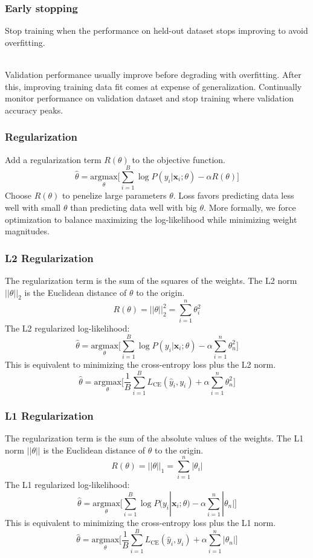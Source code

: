 \documentclass[11pt]{article}
\begin{document}
\subsubsection{Early stopping}
\begin{definition}
Stop training when the performance on held-out dataset stops improving to avoid overfitting.
\end{definition}
$\quad$\\[-1em]
Validation performance usually improve before degrading with overfitting. After this, improving training data fit comes at expense of generalization. Continually monitor performance on validation dataset and stop training where validation accuracy peaks.

\subsubsection{Regularization}
Add a regularization term $R(\theta)$ to the objective function.
$$
\hat{\theta}=\underset{\theta}{\text{argmax}}\Big[\sum_{i=1}^{B}\log P(y_i|\mathbf{x}_i;\theta)-\alpha R(\theta)\Big]
$$
Choose $R(\theta)$ to penelize large parameters $\theta$. Loss favors predicting data less well with small $\theta$ than predicting data well with big $\theta$. More formally, we force optimization to balance maximizing the log-likelihood while minimizing weight magnitudes.

\subsubsection{L2 Regularization}
The regularization term is the sum of the squares of the weights. The L2 norm $||\theta||_2$ is the Euclidean distance of $\theta$ to the origin.
$$
R(\theta)=||\theta||_2^2=\sum_{i=1}^{n}\theta_{i}^2
$$
The L2 regularized log-likelihood:
$$
\hat{\theta}=\underset{\theta}{\text{argmax}}\Big[\sum_{i=1}^{B}\log P(y_i|\mathbf{x}_i;\theta)-\alpha\sum_{i=1}^{n}\theta_{n}^2\Big]
$$
This is equivalent to minimizing the cross-entropy loss plus the L2 norm.
$$
\hat{\theta}=\underset{\theta}{\text{argmax}}\Big[\frac{1}{B}\sum_{i=1}^{B}L_{\text{CE}}(\hat{y}_i,y_i)+\alpha\sum_{i=1}^n\theta_{n}^2\Big]
$$

\subsubsection{L1 Regularization}
The regularization term is the sum of the absolute values of the weights. The L1 norm $||\theta||$ is the Euclidean distance of $\theta$ to the origin.
$$
R(\theta)=||\theta||_1=\sum_{i=1}^{n}|\theta_{i}|
$$
The L1 regularized log-likelihood:
$$
\hat{\theta}=\underset{\theta}{\text{argmax}}\Big[\sum_{i=1}^{B}\log P(y_i|\mathbf{x}_i;\theta)-\alpha\sum_{i=1}^{n}|\theta_{n}|\Big]
$$
This is equivalent to minimizing the cross-entropy loss plus the L1 norm.
$$
\hat{\theta}=\underset{\theta}{\text{argmax}}\Big[\frac{1}{B}\sum_{i=1}^{B}L_{\text{CE}}(\hat{y}_i,y_i)+\alpha\sum_{i=1}^n|\theta_{n}|\Big]
$$
\end{document}
